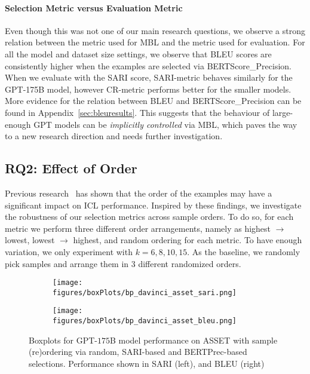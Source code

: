 \documentclass[11pt]{article}
\begin{document}
\paragraph{Selection Metric versus Evaluation Metric} Even though this was not one of our main research questions, we observe a strong relation between the metric used for MBL and the metric used for evaluation. For all the model and dataset size settings, we observe that BLEU scores are consistently higher when the examples are selected via BERTScore\_Precision. When we evaluate with the SARI score, SARI-metric behaves similarly for the GPT-175B model, however CR-metric performs better for the smaller models. More evidence for the relation between BLEU and BERTScore\_Precision can be found in Appendix~\ref{sec:bleuresults}. This suggests that the behaviour of large-enough GPT models can be \textit{implicitly controlled} via MBL, which paves the way to a new research direction and needs further investigation. 

\subsection{RQ2: Effect of Order}
\label{ssec:rq2}


Previous research~\citep{lu-etal-2022-fantastically} has shown that the order of the examples may have a significant impact on ICL performance.  Inspired by these findings, we investigate the robustness of our selection metrics across sample orders. To do so, for each metric we perform three different order arrangements, namely as highest $\rightarrow$ lowest, lowest $\rightarrow$ highest, and random ordering for each metric. To have enough variation, we only experiment with $k=6,8,10,15$. As the baseline, we randomly pick samples and arrange them in 3 different randomized orders. \begin{figure*}[]
    \centering
    \begin{subfigure}[b]{0.47\textwidth} \texttt{[image: figures/boxPlots/bp\_davinci\_asset\_sari.png]}
    \end{subfigure}
\begin{subfigure}[b]{0.47\textwidth}
       \texttt{[image: figures/boxPlots/bp\_davinci\_asset\_bleu.png]}
    \end{subfigure}
    \caption{Boxplots for GPT-$175$B model performance on ASSET with sample (re)ordering via random, SARI-based and BERTPrec-based selections. Performance shown in SARI (left), and BLEU (right) }
    \label{fig:boxplot_davinci_asset}
\end{figure*}
\end{document}
